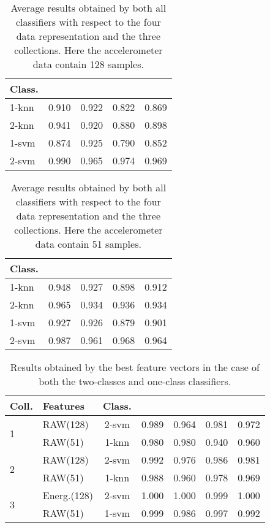 \documentclass[twocolumn]{svjour3}          \smartqed  \usepackage[draft]{hyperref}
\begin{document}
  \begin{table}[tb]
\scriptsize
\centering
\begin{tabular}{lcccc}
	Class.&	 &	 &		&	 \\
\hline 1-knn&	0.910&	0.922&	0.822&	0.869\\ 
[2pt] 
2-knn&	0.941&	0.920&	0.880&	0.898\\ 
[2pt] 
1-svm&	0.874&	0.925&	0.790&	0.852\\ 
[2pt] 
2-svm&	0.990&	0.965&	0.974&	0.969\\ 
[2pt] 
\hline 
\end{tabular}
\medskip
\caption{Average results obtained by both all classifiers with respect to the four data representation and the three collections. Here the accelerometer data contain 128 samples.}
\label{table:summary-3-128}
 \end{table}
 

  \begin{table}[tb]
\scriptsize
\centering
\begin{tabular}{lcccc}
	Class.&	 &	 &		&	 \\
\hline 1-knn&	0.948&	0.927&	0.898&	0.912\\ 
[2pt] 
2-knn&	0.965&	0.934&	0.936&	0.934\\ 
[2pt] 
1-svm&	0.927&	0.926&	0.879&	0.901\\ 
[2pt] 
2-svm&	0.987&	0.961&	0.968&	0.964\\ 
[2pt] 
\hline 
\end{tabular}
\medskip
\caption{Average results obtained by both all classifiers with respect to the four data representation and the three collections. Here the accelerometer data contain 51 samples.}
\label{table:summary-3-51}
 \end{table}
 

 
 \begin{table}[t]
\scriptsize
\centering
\begin{tabular}{llccccc}
	Coll.&Features&Class.	&	 &	 &		&	 \\
\hline \multirow{2}{*}{1}	&RAW(128)	&2-svm&0.989&	0.964&	0.981&	0.972\\ 
&RAW(51)	&1-knn&	0.980&0.980&	0.940&	0.960\\  
[2pt]  
 \hline
\multirow{2}{*}{2}	&RAW(128)	&2-svm&	0.992&	0.976&	0.986&	0.981\\ 
&RAW(51)	&1-knn&	0.988&	0.960&	0.978&	0.969\\ 
[2pt]  
 \hline
\multirow{2}{*}{3}	&Energ.(128)	&2-svm&	1.000&	1.000&	0.999&	1.000\\ 
&RAW(51)	&1-svm&	0.999&	0.986&	0.997&	0.992\\ 
[2pt] 
\hline
\end{tabular}
\medskip
\caption{Results obtained by the best feature vectors in the case of both the two-classes and one-class classifiers.}
\label{table:summary}
 \end{table}
\end{document}
